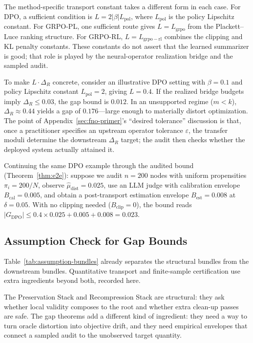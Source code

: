 The method-specific transport constant takes a different form in each case. For DPO, a sufficient condition is $L = 2|\beta| L_{\mathrm{pol}}$, where $L_{\mathrm{pol}}$ is the policy Lipschitz constant. For GRPO-PL, one sufficient route gives $L = L_{\mathrm{grpo}}$ from the Plackett--Luce ranking structure. For GRPO-RL, $L = L_{\mathrm{grpo-rl}}$ combines the clipping and KL penalty constants. These constants do not assert that the learned summarizer is good; that role is played by the neural-operator realization bridge and the sampled audit.

To make $L \cdot \Delta_R$ concrete, consider an illustrative DPO
setting with $\beta = 0.1$ and policy Lipschitz constant
$L_{\mathrm{pol}} = 2$, giving $L = 0.4$. If the realized bridge
budgets imply $\Delta_R \le 0.03$, the gap bound is $0.012$. In an
unsupported regime ($m < k$), $\Delta_R \approx 0.44$ yields a gap of
$0.176$---large enough to materially distort optimization. The point of
Appendix~\ref{sec:fno-primer}'s ``desired tolerance'' discussion is that,
once a practitioner specifies an upstream operator tolerance
$\varepsilon$, the transfer moduli determine the downstream
$\Delta_R$ target; the audit then checks whether the deployed system
actually attained it.

Continuing the same DPO example through the audited bound
(Theorem~\ref{thm:e2e}): suppose we audit $n = 200$ nodes with uniform propensities $\pi_i = 200/N$, observe $\hat{\mu}_{\mathrm{dist}} = 0.025$, use an LLM judge with calibration envelope $B_{\mathrm{cal}} = 0.005$, and obtain a post-transport estimation envelope $B_{\mathrm{est}} = 0.008$ at $\delta = 0.05$. With no clipping needed ($B_{\mathrm{clip}} = 0$), the bound reads $|G_{\mathrm{DPO}}| \le 0.4 \times 0.025 + 0.005 + 0.008 = 0.023$.

\subsection{Assumption Check for Gap Bounds}\label{sec:verification}

Table~\ref{tab:assumption-bundles} already separates the structural bundles from the downstream bundles. Quantitative transport and finite-sample certification use extra ingredients beyond both, recorded here.

The Preservation Stack and Recompression Stack are structural: they ask whether local validity composes to the root and whether extra clean-up passes are safe. The gap theorems add a different kind of ingredient: they need a way to turn oracle distortion into objective drift, and they need empirical envelopes that connect a sampled audit to the unobserved target quantity.

